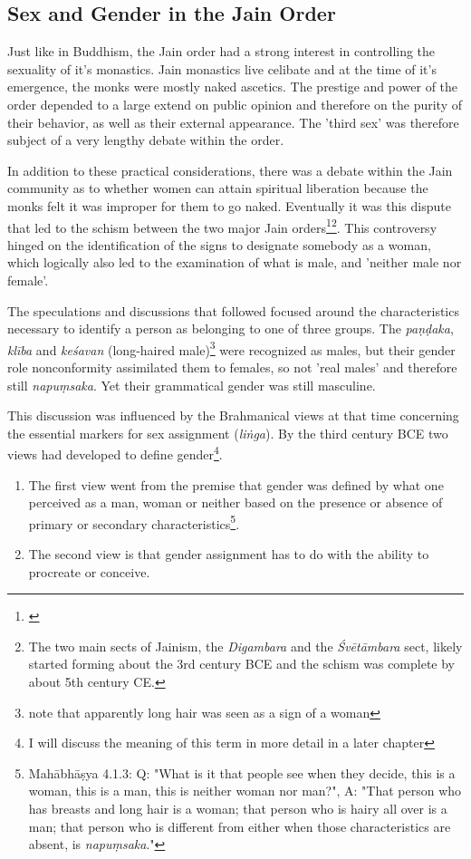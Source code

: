 \subsection{Sex and Gender in the Jain Order}
Just like in Buddhism, the Jain order had a strong interest in controlling the sexuality of it's monastics. Jain monastics live celibate and at the time of it's emergence, the monks were mostly naked ascetics. The prestige and power of the order depended to a large extend on public opinion and therefore on the purity of their behavior, as well as their external appearance. The 'third sex' was therefore subject of a very lengthy debate within the order. 

In addition to these practical considerations, there was a debate within the Jain community as to whether women can attain spiritual liberation because the monks felt it was improper for them to go naked. Eventually it was this dispute that led to the schism between the two major Jain orders\footnote{\cite{dudas}}\footnote{The two main sects of Jainism, the {\em Digambara} and the {\em Śvētāmbara} sect, likely started forming about the 3rd century BCE and the schism was complete by about 5th century CE.}. This controversy hinged on the identification of the signs to designate somebody as a woman, which logically also led to the examination of what is male, and 'neither male nor female'. 

The speculations and discussions that followed focused around the characteristics necessary to identify a person as belonging to one of three groups. The {\em paṇḍaka}, {\em klība} and {\em keśavan} (long-haired male)\footnote{note that apparently long hair was seen as a sign of a woman} were recognized as males, but their gender role nonconformity assimilated them to females, so not 'real males' and therefore still {\em napuṃsaka}. Yet their grammatical gender was still masculine.

This discussion was influenced by the Brahmanical views at that time concerning the essential markers for sex assignment ({\em liṅga}). By the third century BCE two views had developed to define gender\footnote{I will discuss the meaning of this term in more detail in a later chapter}.
\begin{enumerate}
 \item The first view went from the premise that gender was defined by what one perceived as a man, woman or neither based on the presence or absence of primary or secondary characteristics\footnote{Mahābhāṣya 4.1.3: Q: "What is it that people see when they decide, this is a woman, this is a man, this is neither woman nor man?", A: "That person who has breasts and long hair is a woman; that person who is hairy all over is a man; that person who is different from either when those characteristics are absent, is {\em napuṃsaka}."}.
 \item The second view is that gender assignment has to do with the ability to procreate or conceive. 
\end{enumerate}

